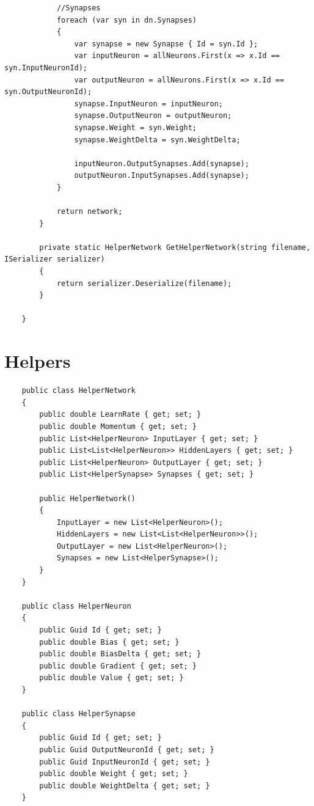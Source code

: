 \documentclass[12pt,a4paper]{article}
\begin{document}
\begin{lstlisting}
            //Synapses
            foreach (var syn in dn.Synapses)
            {
                var synapse = new Synapse { Id = syn.Id };
                var inputNeuron = allNeurons.First(x => x.Id == syn.InputNeuronId);
                var outputNeuron = allNeurons.First(x => x.Id == syn.OutputNeuronId);
                synapse.InputNeuron = inputNeuron;
                synapse.OutputNeuron = outputNeuron;
                synapse.Weight = syn.Weight;
                synapse.WeightDelta = syn.WeightDelta;

                inputNeuron.OutputSynapses.Add(synapse);
                outputNeuron.InputSynapses.Add(synapse);
            }

            return network;
        }

        private static HelperNetwork GetHelperNetwork(string filename, ISerializer serializer)
        {
            return serializer.Deserialize(filename);
        }

    }
	\end{lstlisting}
	
	\section*{Helpers}
	\begin{lstlisting}
	public class HelperNetwork
	{
		public double LearnRate { get; set; }
		public double Momentum { get; set; }
		public List<HelperNeuron> InputLayer { get; set; }
		public List<List<HelperNeuron>> HiddenLayers { get; set; }
		public List<HelperNeuron> OutputLayer { get; set; }
		public List<HelperSynapse> Synapses { get; set; }

		public HelperNetwork()
		{
			InputLayer = new List<HelperNeuron>();
			HiddenLayers = new List<List<HelperNeuron>>();
			OutputLayer = new List<HelperNeuron>();
			Synapses = new List<HelperSynapse>();
		}
	}

	public class HelperNeuron
	{
		public Guid Id { get; set; }
		public double Bias { get; set; }
		public double BiasDelta { get; set; }
		public double Gradient { get; set; }
		public double Value { get; set; }
	}

	public class HelperSynapse
	{
		public Guid Id { get; set; }
		public Guid OutputNeuronId { get; set; }
		public Guid InputNeuronId { get; set; }
		public double Weight { get; set; }
		public double WeightDelta { get; set; }
	}
	\end{lstlisting}
	
\end{document}

